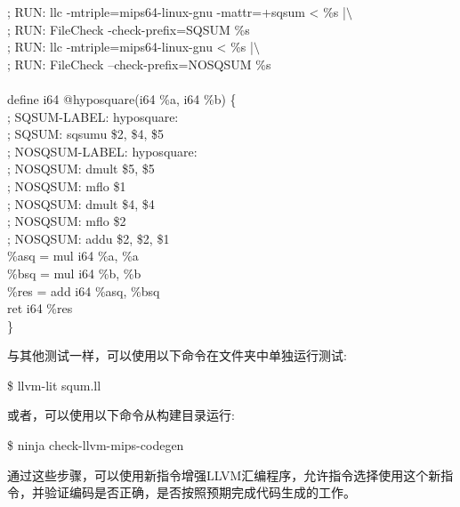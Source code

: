 \begin{tcolorbox}[colback=white,colframe=black]
; RUN: llc -mtriple=mips64-linux-gnu -mattr=+sqsum < \%s |$\setminus$ \\
; RUN: FileCheck -check-prefix=SQSUM \%s \\
; RUN: llc -mtriple=mips64-linux-gnu < \%s |$\setminus$ \\
; RUN: FileCheck --check-prefix=NOSQSUM \%s \\
\\
define i64 @hyposquare(i64 \%a, i64 \%b) \{ \\
; SQSUM-LABEL: hyposquare: \\
; SQSUM: sqsumu \$2, \$4, \$5 \\
; NOSQSUM-LABEL: hyposquare: \\
; NOSQSUM: dmult \$5, \$5 \\
; NOSQSUM: mflo \$1 \\
; NOSQSUM: dmult \$4, \$4 \\
; NOSQSUM: mflo \$2 \\
; NOSQSUM: addu \$2, \$2, \$1 \\
\hspace*{0.5cm}\%asq = mul i64 \%a, \%a \\
\hspace*{0.5cm}\%bsq = mul i64 \%b, \%b \\
\hspace*{0.5cm}\%res = add i64 \%asq, \%bsq \\
\hspace*{0.5cm}ret i64 \%res \\
\}
\end{tcolorbox}

与其他测试一样，可以使用以下命令在文件夹中单独运行测试:\par

\begin{tcolorbox}[colback=white,colframe=black]
\$ llvm-lit squm.ll
\end{tcolorbox}

或者，可以使用以下命令从构建目录运行:

\begin{tcolorbox}[colback=white,colframe=black]
\$  ninja check-llvm-mips-codegen
\end{tcolorbox}

通过这些步骤，可以使用新指令增强LLVM汇编程序，允许指令选择使用这个新指令，并验证编码是否正确，是否按照预期完成代码生成的工作。\par

































